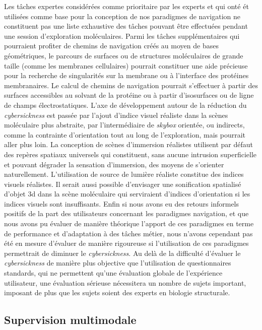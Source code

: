 Les tâches expertes considérées comme prioritaire par les experts et qui onté ét utilisées comme base pour la conception de nos paradigmes de navigation ne constituent pas une liste exhaustive des tâches pouvant être effectuées pendant une session d'exploration moléculaires. Parmi les tâches supplémentaires qui pourraient profiter de chemins de navigation créés au moyen de bases géométriques, le parcours de surfaces ou de structures moléculaires de grande taille (comme les membranes cellulaires) pourrait constituer une aide précieuse pour la recherche de singularités sur la membrane ou à l'interface des protéines membranaires. Le calcul de chemins de navigation pourrait s'effectuer à partir des surfaces accessibles au solvant de la protéine ou à partir d'isosurfaces ou de ligne de champs électrostatiques. 
L'axe de développement autour de la réduction du \textit{cybersickness} est passée par l'ajout  d'indice visuel réaliste dans la scènes moléculaire plus abstraite, par l'intermédiaire de \textit{skybox} orientée, ou indirects, comme la contrainte d'orientation tout au long de l'exploration, mais pourrait aller plus loin. La conception de scènes d'immersion réalistes utilisent par défaut des repères spatiaux universels qui constituent, sans aucune intrusion superficielle et pouvant dégrader la sensation d'immersion, des moyens de s'orienter naturellement. L'utilisation de source de lumière réaliste constitue des indices visuels réalistes. Il serait aussi possible d'envisager une sonification spatialisé d'objet 3d dans la scène moléculaire qui serviraient d'indices d'orientation si les indices visuels sont insuffisants. Enfin si nous avons eu des retours informels positifs de la part des utilisateurs concernant les paradigmes navigation, et que nous avons pu évaluer de manière théorique l'apport de ces paradigmes en terme de performance et d'adaptation à des tâches métier, nous n'avons cependant pas été en mesure d'évaluer de manière rigoureuse si l'utilisation de ces paradigmes permettrait de diminuer le \textit{cybersickness}. Au delà de la difficulté d'évaluer le \emph{cybersickness} de manière plus objective que l'utilisation de questionnaires standards, qui ne permettent qu'une évaluation globale de l'expérience utilisateur, une évaluation sérieuse nécessitera un nombre de sujets important, imposant de plus que les sujets soient des experts en biologie structurale.

\subsection*{Supervision multimodale}


